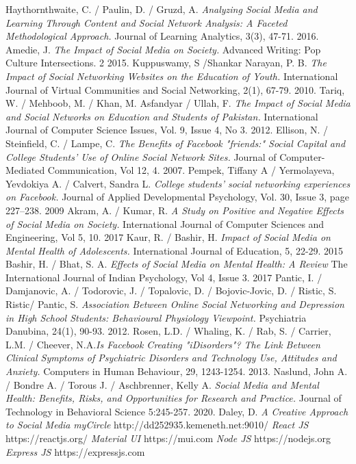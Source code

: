 \documentclass[lettersize,journal]{IEEEtran}
\begin{document}
\begin{thebibliography}{}
    Haythornthwaite, C. / Paulin, D. / Gruzd, A. {\it{Analyzing Social Media
        and Learning Through Content and Social Network Analysis: A Faceted
        Methodological Approach.}} Journal of Learning Analytics, 3(3), 47-71.
        2016.
        Amedie, J. {\it{The Impact of Social Media on Society.}}
        Advanced Writing: Pop Culture Intersections. 2
        2015.
	Kuppuswamy, S /Shankar Narayan, P. B. {\it{The Impact of Social Networking Websites on the Education of Youth.}}
	International Journal of Virtual Communities and Social Networking, 2(1), 67-79.
	2010.
	Tariq, W. / Mehboob, M. / Khan, M. Asfandyar / Ullah, F. {\it{The Impact of Social Media and Social Networks on Education and Students of Pakistan.}} International Journal of Computer Science Issues, Vol. 9, Issue 4, No 3.
	2012.
	Ellison, N. / Steinfield, C. / Lampe, C. {\it{The Benefits of Facebook "friends:" Social Capital and College Students' Use of Online Social Network Sites.}} Journal of Computer-Mediated Communication, Vol 12, 4.
	2007.
	Pempek, Tiffany A / Yermolayeva, Yevdokiya A. / Calvert, Sandra L. {\it{College students’ social networking experiences on
		Facebook.}} Journal of Applied Developmental Psychology, Vol. 30, Issue 3, page 227–238.
	2009
	Akram, A. / Kumar, R. {\it{A Study on Positive and Negative Effects of Social Media on Society.}}
	International Journal of Computer Sciences and Engineering, Vol 5, 10.
	2017
	Kaur, R. / Bashir, H. {\it{Impact of Social Media on Mental Health of Adolescents.}}
	International Journal of Education, 5, 22-29.
	2015
	Bashir, H. / Bhat, S. A. {\it{Effects of Social Media on Mental Health: A Review}}
	The International Journal of Indian Psychology, Vol 4, Issue 3.
	2017
	Pantic, I. / Damjanovic, A. / Todorovic, J. / Topalovic, D. / Bojovic-Jovic, D. / Ristic, S. Ristic/ Pantic, S.
	{\it{Association Between Online Social Networking and Depression in High School Students: Behavioural Physiology Viewpoint.}}
	Psychiatria Danubina, 24(1), 90-93.
	2012.
	Rosen, L.D. / Whaling, K. / Rab, S. / Carrier, L.M. / Cheever, N.A.{\it{Is Facebook Creating "iDisorders"? The Link Between Clinical Symptoms of Psychiatric Disorders and Technology Use, Attitudes and Anxiety.}} Computers in Human Behaviour, 29, 1243-1254.
	2013.
	Naslund, John A. / Bondre A. / Torous J. / Aschbrenner, Kelly A. {\it{Social Media and Mental Health: Benefits, Risks, and Opportunities for Research and Practice.}} Journal of Technology in Behavioral Science 5:245-257.
	2020.
	Daley, D. {\it{A Creative Approach to Social Media}}
	{\it{myCircle}}
	http://dd252935.kemeneth.net:9010/
	{\it{React JS}}
	https://reactjs.org/
	{\it{Material UI}}
	https://mui.com
	{\it{Node JS}}
	https://nodejs.org
	{\it{Express JS}}
	https://expressjs.com
\end{thebibliography}
\end{document}
